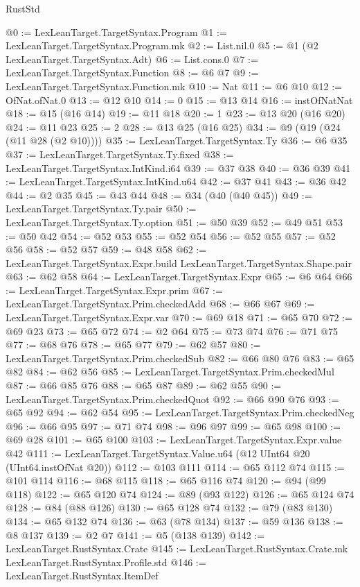 \begin{lexlean}{RustStd}
\begin{coremodule}
@0 := LexLeanTarget.TargetSyntax.Program
@1 := LexLeanTarget.TargetSyntax.Program.mk
@2 := List.nil.{0}
@5 := @1 (@2 LexLeanTarget.TargetSyntax.Adt)
@6 := List.cons.{0}
@7 := LexLeanTarget.TargetSyntax.Function
@8 := @6 @7
@9 := LexLeanTarget.TargetSyntax.Function.mk
@10 := Nat
@11 := @6 @10
@12 := OfNat.ofNat.{0}
@13 := @12 @10
@14 := 0
@15 := @13 @14
@16 := instOfNatNat
@18 := @15 (@16 @14)
@19 := @11 @18
@20 := 1
@23 := @13 @20 (@16 @20)
@24 := @11 @23
@25 := 2
@28 := @13 @25 (@16 @25)
@34 := @9 (@19 (@24 (@11 @28 (@2 @10))))
@35 := LexLeanTarget.TargetSyntax.Ty
@36 := @6 @35
@37 := LexLeanTarget.TargetSyntax.Ty.fixed
@38 := LexLeanTarget.TargetSyntax.IntKind.i64
@39 := @37 @38
@40 := @36 @39
@41 := LexLeanTarget.TargetSyntax.IntKind.u64
@42 := @37 @41
@43 := @36 @42
@44 := @2 @35
@45 := @43 @44
@48 := @34 (@40 (@40 @45))
@49 := LexLeanTarget.TargetSyntax.Ty.pair
@50 := LexLeanTarget.TargetSyntax.Ty.option
@51 := @50 @39
@52 := @49 @51
@53 := @50 @42
@54 := @52 @53
@55 := @52 @54
@56 := @52 @55
@57 := @52 @56
@58 := @52 @57
@59 := @48 @58
@62 := LexLeanTarget.TargetSyntax.Expr.build LexLeanTarget.TargetSyntax.Shape.pair
@63 := @62 @58
@64 := LexLeanTarget.TargetSyntax.Expr
@65 := @6 @64
@66 := LexLeanTarget.TargetSyntax.Expr.prim
@67 := LexLeanTarget.TargetSyntax.Prim.checkedAdd
@68 := @66 @67
@69 := LexLeanTarget.TargetSyntax.Expr.var
@70 := @69 @18
@71 := @65 @70
@72 := @69 @23
@73 := @65 @72
@74 := @2 @64
@75 := @73 @74
@76 := @71 @75
@77 := @68 @76
@78 := @65 @77
@79 := @62 @57
@80 := LexLeanTarget.TargetSyntax.Prim.checkedSub
@82 := @66 @80 @76
@83 := @65 @82
@84 := @62 @56
@85 := LexLeanTarget.TargetSyntax.Prim.checkedMul
@87 := @66 @85 @76
@88 := @65 @87
@89 := @62 @55
@90 := LexLeanTarget.TargetSyntax.Prim.checkedQuot
@92 := @66 @90 @76
@93 := @65 @92
@94 := @62 @54
@95 := LexLeanTarget.TargetSyntax.Prim.checkedNeg
@96 := @66 @95
@97 := @71 @74
@98 := @96 @97
@99 := @65 @98
@100 := @69 @28
@101 := @65 @100
@103 := LexLeanTarget.TargetSyntax.Expr.value @42
@111 := LexLeanTarget.TargetSyntax.Value.u64 (@12 UInt64 @20 (UInt64.instOfNat @20))
@112 := @103 @111
@114 := @65 @112 @74
@115 := @101 @114
@116 := @68 @115
@118 := @65 @116 @74
@120 := @94 (@99 @118)
@122 := @65 @120 @74
@124 := @89 (@93 @122)
@126 := @65 @124 @74
@128 := @84 (@88 @126)
@130 := @65 @128 @74
@132 := @79 (@83 @130)
@134 := @65 @132 @74
@136 := @63 (@78 @134)
@137 := @59 @136
@138 := @8 @137
@139 := @2 @7
@141 := @5 (@138 @139)
@142 := LexLeanTarget.RustSyntax.Crate
@145 := LexLeanTarget.RustSyntax.Crate.mk LexLeanTarget.RustSyntax.Profile.std
@146 := LexLeanTarget.RustSyntax.ItemDef

\end{coremodule}
\end{lexlean}
